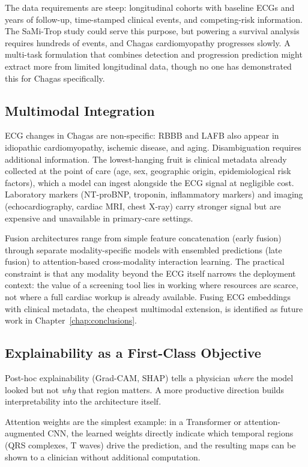 The data requirements are steep: longitudinal cohorts with baseline ECGs and years of follow-up, time-stamped clinical events, and competing-risk information. The SaMi-Trop study could serve this purpose, but powering a survival analysis requires hundreds of events, and Chagas cardiomyopathy progresses slowly. A multi-task formulation that combines detection and progression prediction might extract more from limited longitudinal data, though no one has demonstrated this for Chagas specifically.

\subsection{Multimodal Integration}

ECG changes in Chagas are non-specific: RBBB and LAFB also appear in idiopathic cardiomyopathy, ischemic disease, and aging. Disambiguation requires additional information. The lowest-hanging fruit is clinical metadata already collected at the point of care (age, sex, geographic origin, epidemiological risk factors), which a model can ingest alongside the ECG signal at negligible cost. Laboratory markers (NT-proBNP, troponin, inflammatory markers) and imaging (echocardiography, cardiac MRI, chest X-ray) carry stronger signal but are expensive and unavailable in primary-care settings.

Fusion architectures range from simple feature concatenation (early fusion) through separate modality-specific models with ensembled predictions (late fusion) to attention-based cross-modality interaction learning. The practical constraint is that any modality beyond the ECG itself narrows the deployment context: the value of a screening tool lies in working where resources are scarce, not where a full cardiac workup is already available. Fusing ECG embeddings with clinical metadata, the cheapest multimodal extension, is identified as future work in Chapter~\ref{chap:conclusions}.

\subsection{Explainability as a First-Class Objective}

Post-hoc explainability (Grad-CAM, SHAP) tells a physician \emph{where} the model looked but not \emph{why} that region matters. A more productive direction builds interpretability into the architecture itself.

Attention weights are the simplest example: in a Transformer or attention-augmented CNN, the learned weights directly indicate which temporal regions (QRS complexes, T waves) drive the prediction, and the resulting maps can be shown to a clinician without additional computation.

